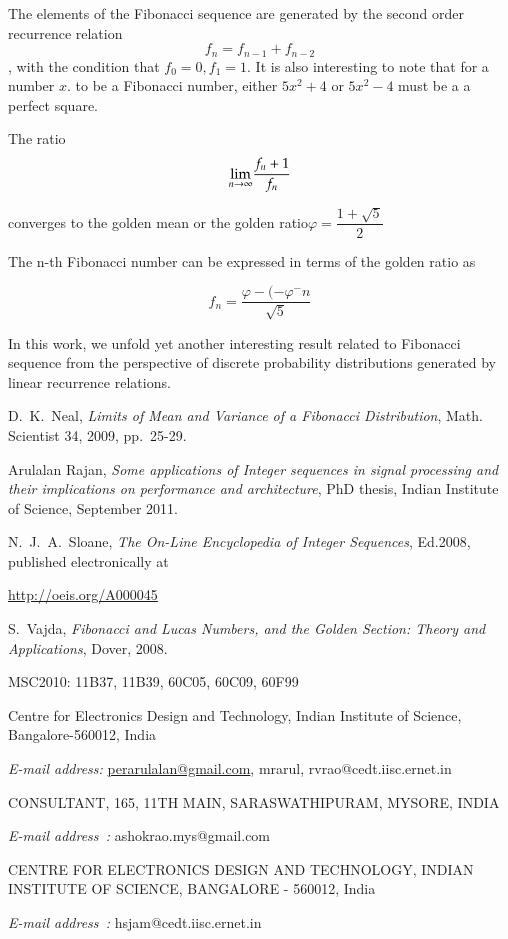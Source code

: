 \begin{multicols}{2}
The elements of the Fibonacci sequence are generated by the second order recurrence relation
$$
f_{n}=f_{n-1}+f_{n-2}
$$
, with the condition that $f_{0} = 0, f_{1} = 1$. It is also interesting to note that for a number $x$. to be a Fibonacci number, either $5x^{2} + 4$ or $5x^{2}-4$ must be a a perfect square.

The ratio
$$
{\rm \lim_{{\it n} \rightarrow \infty}} \dfrac{f_{n}+1}{f_{n}}
$$

converges to the golden mean or the golden ratio\break $\varphi =\dfrac{1+\sqrt{5}}{2}$

The n-th Fibonacci number can be expressed in terms of the golden ratio as

\vspace{-.3cm}

$$
f_{n}= \dfrac{\varphi-(-\varphi^{-}n}{\sqrt{5}}
$$

\vspace{-.3cm}

In this work, we unfold yet another interesting result related to Fibonacci sequence from the perspective of discrete probability distributions generated by linear recurrence relations.


\begin{thebibliography}{99} 
 D.~K.~Neal, \textit{Limits of Mean and Variance of a {F}ibonacci Distribution}, Math. Scientist 34, 2009, pp.~25-29.

 Arulalan Rajan, \textit{Some applications of Integer sequences in signal processing and their implications on performance and architecture}, PhD thesis, Indian Institute of Science, September 2011.

 N.~J.~A.~Sloane, \textit{The On-Line Encyclopedia of Integer Sequences}, Ed.2008, published electronically at 

\url{http://oeis.org/A000045}

 S.~Vajda, \textit{{F}ibonacci and {L}ucas Numbers, and the Golden Section: Theory and Applications}, Dover, 2008.

MSC2010: 11B37, 11B39, 60C05, 60C09, 60F99

Centre for Electronics Design and Technology, Indian Institute of Science, Bangalore-560012, India

{\it E-mail address:} \url{perarulalan@gmail.com}, {mrarul, rvrao}@cedt.iisc.ernet.in

CONSULTANT, 165, 11TH MAIN, SARASWATHIPURAM, MYSORE, INDIA

{\it E-mail address~:} ashokrao.mys@gmail.com

CENTRE FOR ELECTRONICS DESIGN AND TECHNOLOGY, INDIAN INSTITUTE OF SCIENCE, BANGALORE - 560012, India

{\it E-mail address~:} hsjam@cedt.iisc.ernet.in


\end{thebibliography}

\end{multicols}

